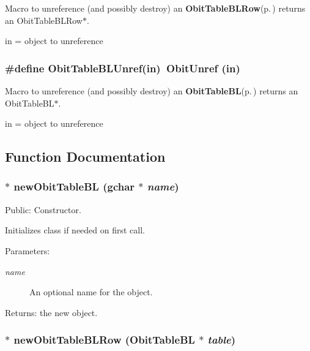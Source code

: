 Macro to unreference (and possibly destroy) an {\bf Obit\-Table\-BLRow}{\rm (p.\,\pageref{structObitTableBLRow})} returns an Obit\-Table\-BLRow$\ast$. 

in = object to unreference 
\subsubsection{\setlength{\rightskip}{0pt plus 5cm}\#define Obit\-Table\-BLUnref(in)\ Obit\-Unref (in)}\label{ObitTableBL_8h_a1}


Macro to unreference (and possibly destroy) an {\bf Obit\-Table\-BL}{\rm (p.\,\pageref{structObitTableBL})} returns an Obit\-Table\-BL$\ast$. 

in = object to unreference 

\subsection{Function Documentation}
\subsubsection{$\ast$ new\-Obit\-Table\-BL (gchar $\ast$ {\em name})}\label{ObitTableBL_8h_a11}


Public: Constructor. 

Initializes class if needed on first call. \begin{Desc}
\item[Parameters:]
\begin{description}
\item[{\em name}]An optional name for the object. \end{description}
\end{Desc}
\begin{Desc}
\item[Returns:]the new object. \end{Desc}
\subsubsection{$\ast$ new\-Obit\-Table\-BLRow ({\bf Obit\-Table\-BL} $\ast$ {\em table})}\label{ObitTableBL_8h_a8}


